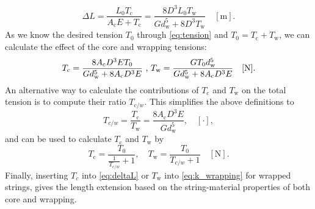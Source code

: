 \documentclass{article}
\begin{document}
\begin{sloppy}
%
\begin{equation}
    \Delta L = \frac{L_0T_\text{c}}{A_\text{c}E + T_\text{c}} = \frac{8D^3L_0T_\text{w}}{Gd_\text{w}^5 + 8D^3T_\text{w}} \quad [\text{m}].
\end{equation}
%
As we know the desired tension $T_0$ through \eqref{eq:tension} and $T_0 = T_\text{c} + T_\text{w}$, we can calculate the effect of the core and wrapping tensions:
%
\begin{equation}
    T_\text{c} = \frac{8A_\text{c}D^3ET_0}{Gd_\text{w}^5+8A_\text{c}D^3E}\text{ , } \newline
    T_\text{w} = \frac{GT_0d_\text{w}^5}{Gd_\text{w}^5 + 8A_\text{c}D^3E} \quad [\text{N}].
\end{equation}
%
An alternative way to calculate the contributions of $T_\text{c}$ and $T_\text{w}$ on the total tension is to compute their ratio $T_{c/w}$. This simplifies the above definitions to
%
\begin{equation}
    T_{c/w} = \frac{T_\text{c}}{T_\text{w}} = \frac{8A_\text{c}D^3E}{Gd_\text{w}^5},  \quad [\cdot],
\end{equation}
%
and can be used to calculate $T_\text{c}$ and $T_\text{w}$ by
%
\begin{equation}\label{eq:Tc_derived}
    T_\text{c} = \frac{T_0}{\frac{1}{T_{c/w}}+1}, \quad T_\text{w} = \frac{T_0}{T_{c/w}+1}\quad [\text{N}].
\end{equation}
%
Finally, inserting $T_c$ into \eqref{eq:deltaL} or $T_\text{w}$ into \eqref{eq:k_wrapping} for wrapped strings, gives the length extension based on the string-material properties of both core and wrapping. 
%
%

\end{sloppy}
\end{document}

